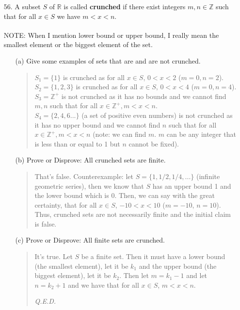 \documentclass[12pt, a4paper]{article}                      %
\begin{document}
\begin{itemize}
\item[]
\item[]

\item[56.]
A subset $S$ of $\mathbb{R}$ is called \textbf{crunched} if there exist integers $m, n \in \mathbb{Z}$ such that for all $x \in S$ we have $m < x < n$.\\\\
NOTE: When I mention lower bound or upper bound, I really mean the smallest element or the biggest element of the set.
\begin{itemize}
\item[]

\item[(a)]
Give some examples of sets that are and are not crunched.
\begin{quote}
$S_1 = \{1\}$ is crunched as for all $x \in S$, $0 < x < 2$ ($m = 0, n = 2$).\\
$S_2 = \{1, 2, 3\}$ is crunched as for all $x \in S$, $0 < x < 4$ ($m = 0, n = 4$).\\
$S_3 = \mathbb{Z^+}$ is not crunched as it has no bounds and we cannot find $m, n$ such that for all $x \in \mathbb{Z^+}, m< x < n$.\\
$S_4 = \{2,4,6 ...\}$ (a set of positive even numbers) is not crunched as it has no upper bound and we cannot find $n$ such that for all $x \in \mathbb{Z^+}, m< x < n$ (note: we can find $m$. $m$ can be any integer that is less than or equal to 1 but $n$ cannot be fixed).
\end{quote}

\item[]

\item[(b)]
Prove or Disprove: All crunched sets are finite.
\begin{quote}
That's false. Counterexample: let $S = \{1, 1/2, 1/4, ...\}$ (infinite geometric series), then we know that $S$ has an upper bound 1 and the lower bound which is 0. Then, we can say with the great certainty, that for all $x \in S$, $-10 < x < 10$ ($m = -10$, $n = 10$).
Thus, crunched sets are not necessarily finite and the initial claim is false.
\end{quote} 

\item[]

\item[(c)]
Prove or Disprove: All finite sets are crunched.
\begin{quote}
It's true. Let $S$ be a finite set. Then it must have a lower bound (the smallest element), let it be $k_1$ and the upper bound (the biggest element), let it be $k_2$. Then let $m = k_1 - 1$ and let $n = k_2 + 1$ and we have that for all $x \in S$, $m < x < n$.
\begin{flushright}
\textit{Q.E.D.}
\end{flushright}
\end{quote}


\end{itemize}
\end{itemize}
\end{document}
